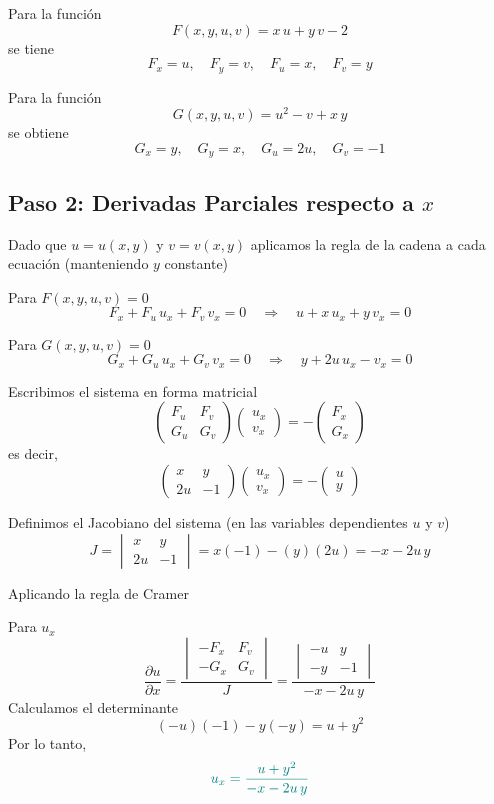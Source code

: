 \documentclass{article}
\begin{document}
Para la función
\[
F(x,y,u,v)= x\,u + y\,v - 2
\]
se tiene
\[
F_x = u,\quad F_y = v,\quad F_u = x,\quad F_v = y
\]

Para la función
\[
G(x,y,u,v)= u^2 - v + x\,y
\]
se obtiene
\[
G_x = y,\quad G_y = x,\quad G_u = 2u,\quad G_v = -1
\]

\subsection*{Paso 2: Derivadas Parciales respecto a \(x\)}

Dado que \(u = u(x,y)\) y \(v = v(x,y)\) aplicamos la regla de la cadena a cada ecuación (manteniendo \(y\) constante)

Para \(F(x,y,u,v)=0\)
\[
F_x + F_u\,u_x + F_v\,v_x = 0 \quad \Longrightarrow \quad u + x\,u_x + y\,v_x = 0
\]

Para \(G(x,y,u,v)=0\)
\[
G_x + G_u\,u_x + G_v\,v_x = 0 \quad \Longrightarrow \quad y + 2u\,u_x - v_x = 0
\]

Escribimos el sistema en forma matricial
\[
\begin{pmatrix}
F_u & F_v \\
G_u & G_v
\end{pmatrix}
\begin{pmatrix}
u_x \\[3mm] v_x
\end{pmatrix}
=
-\begin{pmatrix}
F_x \\[3mm] G_x
\end{pmatrix}
\]
es decir,
\[
\begin{pmatrix}
x & y \\
2u & -1
\end{pmatrix}
\begin{pmatrix}
u_x \\[3mm] v_x
\end{pmatrix}
=
-\begin{pmatrix}
u \\[3mm] y
\end{pmatrix}
\]

Definimos el Jacobiano del sistema (en las variables dependientes \(u\) y \(v\))
\[
J = \begin{vmatrix} x & y \\[2mm] 2u & -1 \end{vmatrix} = x(-1) - (y)(2u) = -x - 2u\,y
\]

Aplicando la regla de Cramer

Para \( \displaystyle u_x\)
\[
\frac{\partial u}{\partial x} =
\frac{
\begin{vmatrix}
- F_x & F_v \\
- G_x & G_v
\end{vmatrix}
}{J}
=\frac{
\begin{vmatrix}
- u & y \\
- y & -1
\end{vmatrix}
}{-x - 2u\,y}
\]
Calculamos el determinante
\[
(-u)(-1) - y(-y) = u + y^2
\]
Por lo tanto,
\[\color{teal}
u_x = \frac{u + y^2}{-x - 2u\,y}
\]
\end{document}
